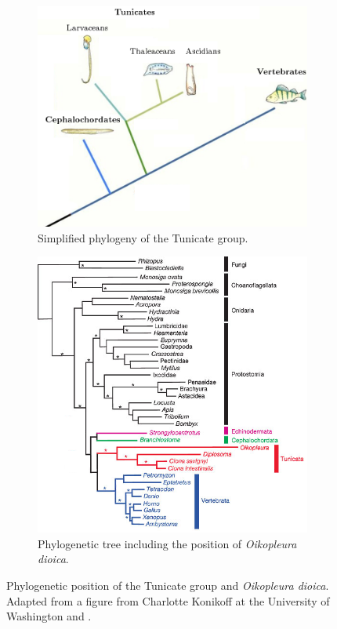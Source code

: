 \documentclass[11pt,twoside,a4paper]{report}
\begin{document}
		\begin{figure}[here]
			\centering
			\begin{subfigure}{.5\textwidth}
				\centering
				\includegraphics[width=1\linewidth]{pngs/phylogeny.png}
				\caption{Simplified phylogeny of the Tunicate group.}
			\end{subfigure}%
			\begin{subfigure}{.5\textwidth}
				\centering
				\includegraphics[width=1\linewidth]{pngs/tree.png}
				\caption{Phylogenetic tree including the position of \textit{Oikopleura dioica}.}
			\end{subfigure}
			\caption{Phylogenetic position of the Tunicate group and \textit{Oikopleura dioica}.
				{\footnotesize
					Adapted from a figure from Charlotte Konikoff at the University of Washington and \cite{Delsuc2006}.
				}
			}
			\label{fig:tree}
		\end{figure}
		
\end{document}
